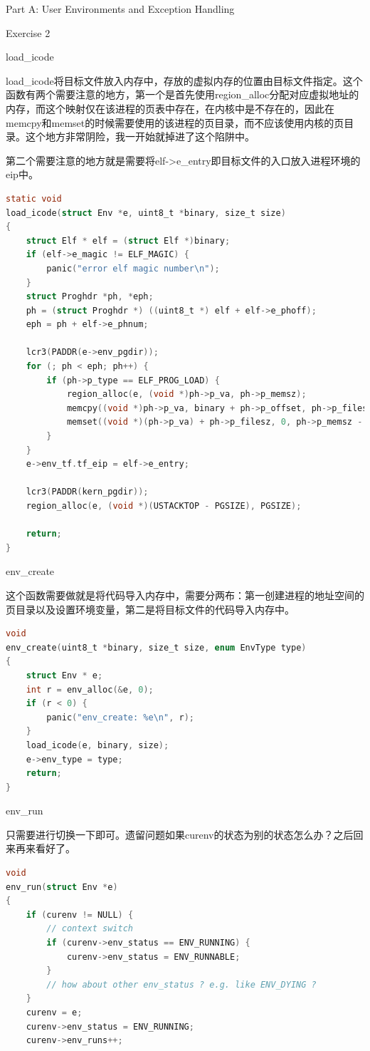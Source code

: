 \documentclass[GBK,winfonts,a4paper,10pt]{ctexart}
\begin{document}
\begin{section}{ Part A: User Environments and Exception Handling }
\begin{subsection}{ Exercise 2 }
\begin{subsubsection}{load\_icode}
\par
load\_icode将目标文件放入内存中，存放的虚拟内存的位置由目标文件指定。这个函数有两个需要注意的地方，第一个是首先使用region\_alloc分配对应虚拟地址的内存，而这个映射仅在该进程的页表中存在，在内核中是不存在的，因此在memcpy和memset的时候需要使用的该进程的页目录，而不应该使用内核的页目录。这个地方非常阴险，我一开始就掉进了这个陷阱中。
\par
第二个需要注意的地方就是需要将elf->e\_entry即目标文件的入口放入进程环境的eip中。
\begin{lstlisting}[language=C]
static void
load_icode(struct Env *e, uint8_t *binary, size_t size)
{
    struct Elf * elf = (struct Elf *)binary;
    if (elf->e_magic != ELF_MAGIC) {
        panic("error elf magic number\n");
    }
    struct Proghdr *ph, *eph;
    ph = (struct Proghdr *) ((uint8_t *) elf + elf->e_phoff);
    eph = ph + elf->e_phnum;

    lcr3(PADDR(e->env_pgdir));
    for (; ph < eph; ph++) {
        if (ph->p_type == ELF_PROG_LOAD) {
            region_alloc(e, (void *)ph->p_va, ph->p_memsz);
            memcpy((void *)ph->p_va, binary + ph->p_offset, ph->p_filesz);
            memset((void *)(ph->p_va) + ph->p_filesz, 0, ph->p_memsz - ph->p_filesz);
        }
    }
    e->env_tf.tf_eip = elf->e_entry;

    lcr3(PADDR(kern_pgdir));
    region_alloc(e, (void *)(USTACKTOP - PGSIZE), PGSIZE);

    return;
}
\end{lstlisting}
\end{subsubsection}


\begin{subsubsection}{env\_create}
\par
这个函数需要做就是将代码导入内存中，需要分两布：第一创建进程的地址空间的页目录以及设置环境变量，第二是将目标文件的代码导入内存中。
\begin{lstlisting}[language=C]
void
env_create(uint8_t *binary, size_t size, enum EnvType type)
{
    struct Env * e;
    int r = env_alloc(&e, 0);
    if (r < 0) {
        panic("env_create: %e\n", r);
    }
    load_icode(e, binary, size);
    e->env_type = type;
    return;
}
\end{lstlisting}
\end{subsubsection}

\begin{subsubsection}{env\_run}
\par
只需要进行切换一下即可。遗留问题如果curenv的状态为别的状态怎么办？之后回来再来看好了。
\begin{lstlisting}[language=C]
void
env_run(struct Env *e)
{
    if (curenv != NULL) {
        // context switch
        if (curenv->env_status == ENV_RUNNING) {
            curenv->env_status = ENV_RUNNABLE;
        }
        // how about other env_status ? e.g. like ENV_DYING ?
    }
    curenv = e;
    curenv->env_status = ENV_RUNNING;
    curenv->env_runs++;
    

\end{lstlisting}
\end{subsubsection}
\end{subsection}
\end{section}
\end{document}
